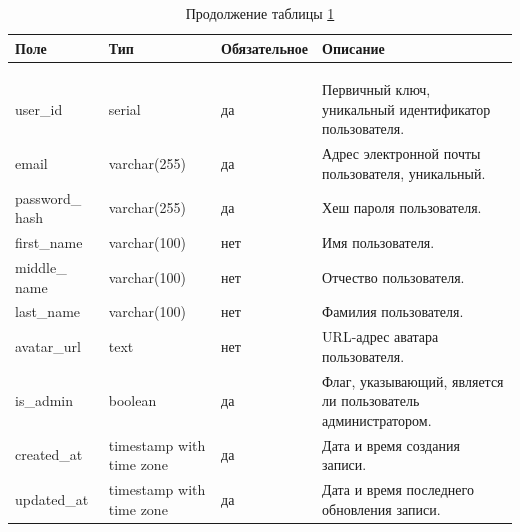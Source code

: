 \begin{xltabular}{\textwidth}{|p{2.5cm}|p{4cm}|p{1.7cm}|X|}
	\caption{Атрибуты сущности «Users»\label{users:table}}\\ \hline
	\centrow Поле & \centrow Тип & \centrow Обяза\-тельное & \centrow Описание \\ \hline
	 &  &  &  \\ \hline
	\endfirsthead
	\caption*{Продолжение таблицы \ref{users:table}} \\ \hline
	 &  &  &  \\ \hline
	\finishhead
	user\_id & serial & \centrow да & Первичный ключ, уникальный идентификатор пользователя. \\ \hline
	email & varchar(255) & \centrow да & Адрес электронной почты пользователя, уникальный. \\ \hline
	password\_ hash & varchar(255) & \centrow да & Хеш пароля пользователя. \\ \hline
	first\_name & varchar(100) & \centrow нет & Имя пользователя. \\ \hline
	middle\_ name & varchar(100) & \centrow нет & Отчество пользователя. \\ \hline
	last\_name & varchar(100) & \centrow нет & Фамилия пользователя. \\ \hline
	avatar\_url & text & \centrow нет & URL-адрес аватара пользователя. \\ \hline
	is\_admin & boolean & \centrow да & Флаг, указывающий, является ли пользователь администратором. \\ \hline
	created\_at & timestamp with time zone & \centrow да & Дата и время создания записи. \\ \hline
	updated\_at & timestamp with time zone & \centrow да & Дата и время последнего обновления записи. \\ \hline
\end{xltabular}

